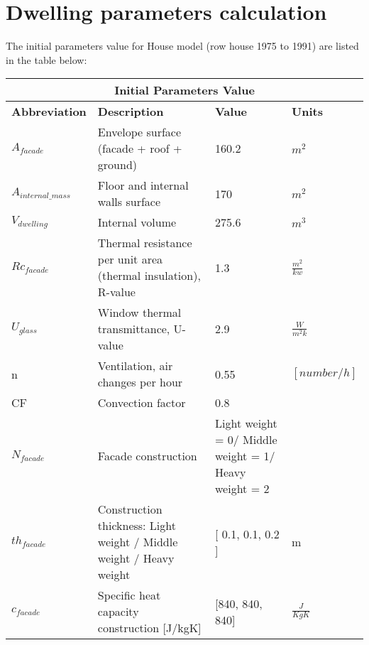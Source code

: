 \appendix
\section{Dwelling parameters calculation}
The initial parameters value for House model (row house 1975 to 1991) are listed in the table below\cite{VOORBEELD}:


\begin{table}[H]
    \centering
    
\begin{tabular}{|p{3cm}||p{7cm}||p{3cm}||p{3cm}|}
 \hline
 \multicolumn{4}{|c|}{Initial Parameters Value} \\
 \hline
\textbf{Abbreviation} & \textbf{Description} & \textbf{Value} & \textbf{Units}\\
 \hline
 
$A_{facade}$ & Envelope surface (facade + roof + ground)   & 160.2 &  $m^2$\\
 \hline

$A_{internal{\_}mass}$ & Floor and internal walls surface    & 170 & $m^2$\\
 \hline

 $V_{dwelling}$ & Internal volume & 275.6 &$m^3$\\
  \hline

 $Rc_{facade}$ & Thermal resistance per unit area (thermal insulation), R-value & 1.3 &  $\frac{m^2}{kw}$\\
  \hline

 $U_{glass}$& Window thermal transmittance, U-value & 2.9 &$\frac{W}{m^2k}$\\
 \hline

n & Ventilation, air changes per hour  & 0.55 & $[number/h]$\\

\hline

 CF& Convection factor & 0.8 &\\
 \hline
 
 $N_{facade}$ &Facade construction & Light weight = 0/ Middle weight = 1/ Heavy weight = 2 &  \\
 \hline
 
  $th_{facade}$& Construction thickness: Light weight / Middle weight / Heavy weight  & [ 0.1,  0.1, 0.2 ] & m \\
 \hline
  
 $c_{facade}$& Specific heat capacity construction [J/kgK] & [840, 840, 840] &$\frac{J}{KgK}$\\
 \hline
 

\end{tabular}
\end{table}
